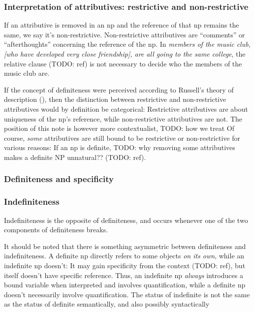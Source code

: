 \documentclass[UTF8, a4paper, oneside, scheme=plain]{ctexrep}
\newcommand{\corpus}[1]{\emph{#1}}
\begin{document}
\subsubsection{Interpretation of attributives: restrictive and non-restrictive}

If an attributive is removed in an \acs{np} 
and the reference of that \acs{np} remains the same,
we say it's non-restrictive.
Non-restrictive attributives are ``comments'' or ``afterthoughts'' concerning the reference of the \acs{np}.
In \corpus{members of the music club, 
[who have developed very close friendship], 
are all going to the same college},
the relative clause (TODO: ref) is not necessary to decide who the members of the music club are.

If the concept of definiteness were perceived according to Russell's theory of description 
(),
then the distinction between restrictive and non-restrictive attributives 
would by definition be categorical:
Restrictive attributives are about uniqueness of the \acs{np}'s reference,
while non-restrictive attributives are not.
The position of this note is however more contextualist,
TODO: how we treat 
Of course, \emph{some} attributives are still bound to be restrictive 
or non-restrictive for various reasons:
If an \acs{np} is definite, 
TODO: why removing some attributives makes a definite NP unnatural??
(TODO: ref).

\subsubsection{Definiteness and specificity}



\subsubsection{Indefiniteness}

Indefiniteness is the opposite of definiteness,
and occurs whenever one of the two components of definiteness breaks.

It should be noted that there is something asymmetric between definiteness and indefiniteness.
A definite \acs{np} directly refers to some objects \emph{on its own},
while an indefinite \acs{np} doesn't:
It may gain specificity from the context (TODO: ref), 
but itself doesn't have specific reference.
Thus, an indefinite \acs{np} \emph{always} introduces a bound variable when interpreted 
and involves quantification,
while a definite \acs{np} doesn't necessarily involve quantification.
The status of indefinite is not the same as the status of definite semantically,
and also possibly syntactically \citep{gianollo2021reference,klockmann2020article}
\end{document}
